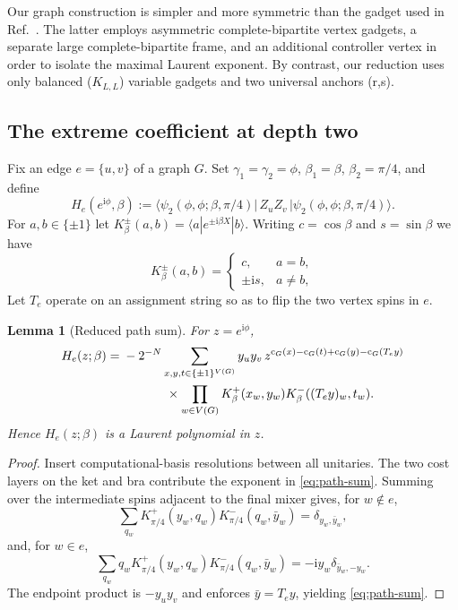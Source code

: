 \documentclass[11pt]{article}
\newtheorem{lemma}[theorem]{Lemma}
\newcommand{\Cut}{\operatorname{c}}
\newcommand{\ii}{\mathrm{i}}
\begin{document}
Our graph construction is simpler and more symmetric than the gadget used in Ref.~\cite{WangEtAl2025}.  The latter employs asymmetric complete-bipartite vertex gadgets, a separate large complete-bipartite frame, and an additional controller vertex in order to isolate the maximal Laurent exponent.  By contrast, our reduction uses only balanced ($K_{L,L}$) variable gadgets and two universal anchors (r,s). %





\subsection{The extreme coefficient at depth two}\label{sec:coefficient}

Fix an edge $e=\{u,v\}$ of a graph $G$. 
Set $\gamma_1=\gamma_2=\phi$, 
$\beta_1=\beta$, $\beta_2=\pi/4$, and define
\begin{equation}
  H_e(e^{\ii\phi},\beta)
 :=\langle\psi_2(\phi,\phi;\beta,\pi/4)|\,Z_uZ_v\,|
 \psi_2(\phi,\phi;\beta,\pi/4)\rangle.
 \label{eq:edge-correlator}
\end{equation}
For $a,b\in\{\pm1\}$ let
$ K_\beta^\pm(a,b)=\langle a|e^{\pm\ii\beta X}|b\rangle$. 
Writing $c=\cos\beta$ and $s=\sin\beta$ we have
\begin{equation}
 K_\beta^\pm(a,b)=
 \begin{cases}c,&a=b,\\ \pm\ii s,&a\ne b,\end{cases}
 \label{eq:kernel-values}
\end{equation}
Let $T_e$ operate on an assignment string so as to flip the two %
vertex spins in $e$.




\begin{lemma}[Reduced path sum]\label{lem:path-sum}
For $z=e^{\ii\phi}$,
\begin{align}
 H_e(z;\beta)
 ={}&-2^{-N}\sum_{x,y,t\in\{\pm1\}^{V(G)}}
 y_uy_v\,
 z^{\Cut_G(x)-\Cut_G(t)+\Cut_G(y)-\Cut_G(T_ey)}
 \notag\\
 &\hspace{1.2cm}\times
 \prod_{w\in V(G)}K_\beta^+(x_w,y_w)
 K_\beta^-((T_ey)_w,t_w).
 \label{eq:path-sum}
\end{align}
Hence $H_e(z;\beta)$ is a Laurent polynomial in $z$.
\end{lemma}

\begin{proof}
Insert computational-basis resolutions between all unitaries.  The two cost layers on the
ket and bra contribute the exponent in \eqref{eq:path-sum}.  Summing over the intermediate
spins adjacent to the final mixer gives, for $w\notin e$,
\begin{equation}
 \sum_{q_w}K_{\pi/4}^+(y_w,q_w)K_{\pi/4}^-(q_w,\bar y_w)
 =\delta_{y_w,\bar y_w},
\end{equation}
and, for $w\in e$,
\begin{equation}
 \sum_{q_w}q_wK_{\pi/4}^+(y_w,q_w)K_{\pi/4}^-(q_w,\bar y_w)
 =-\ii y_w\delta_{\bar y_w,-y_w}.
\end{equation}
The endpoint product is $-y_uy_v$ and enforces $\bar y=T_ey$, yielding
\eqref{eq:path-sum}.
\end{proof}
\end{document}
